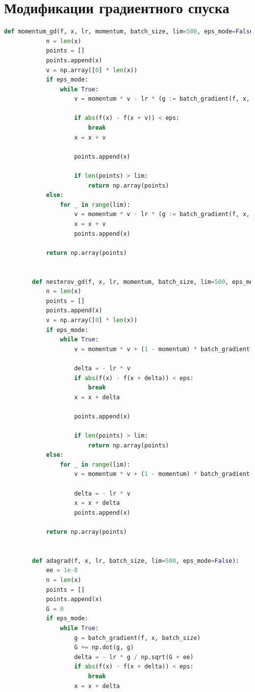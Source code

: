 \documentclass[a4paper,14pt,oneside,openany]{memoir}
\begin{document}
    \newpage
    
	\section {Модификации градиентного спуска}
	
	\begin{lstlisting}[language=Python, caption=Реализации различных модификаций стохастического градиентного спуска]
		def momentum_gd(f, x, lr, momentum, batch_size, lim=500, eps_mode=False):
		    n = len(x)
		    points = []
		    points.append(x)
		    v = np.array([0] * len(x))
		    if eps_mode:
		        while True:
		            v = momentum * v - lr * (g := batch_gradient(f, x, batch_size))
		
		            if abs(f(x) - f(x + v)) < eps:
		                break
		            x = x + v
		
		            points.append(x)
		
		            if len(points) > lim:
		                return np.array(points)
		    else:
		        for _ in range(lim):
		            v = momentum * v - lr * (g := batch_gradient(f, x, batch_size))
		            x = x + v
		            points.append(x)
		
		    return np.array(points)
		
		
		def nesterov_gd(f, x, lr, momentum, batch_size, lim=500, eps_mode=False):
		    n = len(x)
		    points = []
		    points.append(x)
		    v = np.array([0] * len(x))
		    if eps_mode:
		        while True:
		            v = momentum * v + (1 - momentum) * batch_gradient(f,
		                                                               x - lr * momentum * v, batch_size)
		            delta = - lr * v
		            if abs(f(x) - f(x + delta)) < eps:
		                break
		            x = x + delta
		
		            points.append(x)
		
		            if len(points) > lim:
		                return np.array(points)
		    else:
		        for _ in range(lim):
		            v = momentum * v + (1 - momentum) * batch_gradient(f,
		                                                               x - lr * momentum * v, batch_size)
		            delta = - lr * v
		            x = x + delta
		            points.append(x)
		
		    return np.array(points)
		
		
		def adagrad(f, x, lr, batch_size, lim=500, eps_mode=False):
		    ee = 1e-8
		    n = len(x)
		    points = []
		    points.append(x)
		    G = 0
		    if eps_mode:
		        while True:
		            g = batch_gradient(f, x, batch_size)
		            G += np.dot(g, g)
		            delta = - lr * g / np.sqrt(G + ee)
		            if abs(f(x) - f(x + delta)) < eps:
		                break
		            x = x + delta
		

\end{lstlisting}
\end{document}
